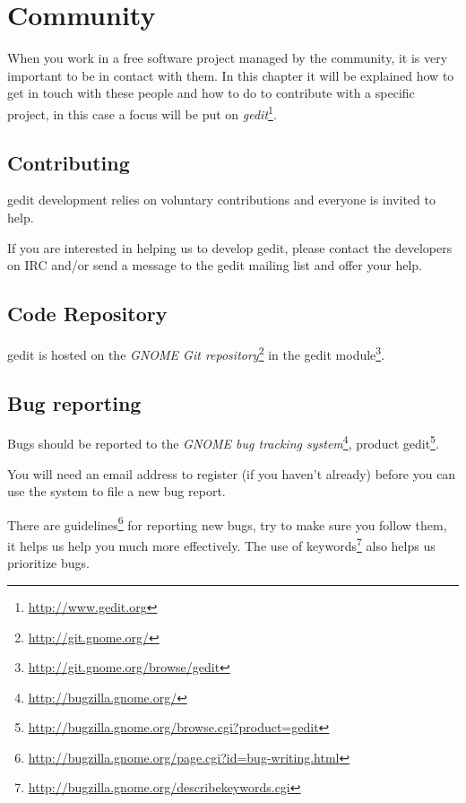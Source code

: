 
\chapter{Community}


When you work in a free software project managed by the community, it is very important to be in contact with them. In this chapter it will be explained how to get in touch with these people and how to do to contribute with a specific project, in this case a focus will be put on \emph{gedit}\footnote{\url{http://www.gedit.org}}.

\section{Contributing}\label{Contributing}

gedit development relies on voluntary contributions and everyone is invited to help.

If you are interested in helping us to develop gedit, please contact the developers on IRC and/or send a message to the gedit mailing list and offer your help.

\section{Code Repository}\label{Repository}

gedit is hosted on the \emph{GNOME Git repository}\footnote{\url{http://git.gnome.org/}} in the gedit module\footnote{\url{http://git.gnome.org/browse/gedit}}.

\section{Bug reporting}\label{Bugs}

Bugs should be reported to the \emph{GNOME bug tracking system}\footnote{\url{http://bugzilla.gnome.org/}}, product gedit\footnote{\url{http://bugzilla.gnome.org/browse.cgi?product=gedit}}.

You will need an email address to register (if you haven't already) before you can use the system to file a new bug report.

There are guidelines\footnote{\url{http://bugzilla.gnome.org/page.cgi?id=bug-writing.html}} for reporting new bugs, try to make sure you follow them, it helps us help you much more effectively. The use of keywords\footnote{\url{http://bugzilla.gnome.org/describekeywords.cgi}} also helps us prioritize bugs.

